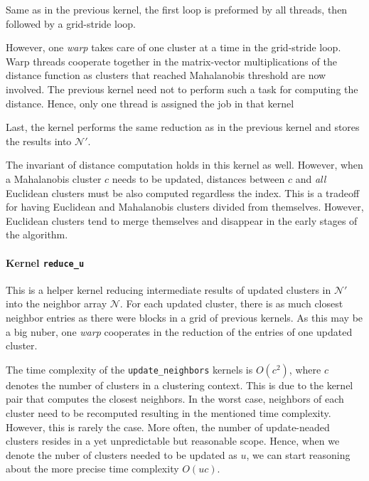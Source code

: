 Same as in the previous kernel, the first loop is preformed by all threads, then followed by a grid-stride loop. 

However, one \emph{warp} takes care of one cluster at a time in the grid-stride loop. Warp threads cooperate together in the matrix-vector multiplications of the distance function as clusters that reached Mahalanobis threshold are now involved. The previous kernel need not to perform such a task for computing the distance. Hence, only one thread is assigned the job in that kernel

Last, the kernel performs the same reduction as in the previous kernel and stores the results into $\mathcal{N}'$.

\begin{rem}
	The invariant of distance computation holds in this kernel as well. However, when a Mahalanobis cluster $c$ needs to be updated, distances between $c$ and \emph{all} Euclidean clusters must be also computed regardless the index. This is a tradeoff for having Euclidean and Mahalanobis clusters divided from themselves. However, Euclidean clusters tend to merge themselves and disappear in the early stages of the algorithm.
\end{rem}

\paragraph{Kernel \texttt{reduce\_u}} This is a helper kernel reducing intermediate results of updated clusters in $\mathcal{N}'$ into the neighbor array $\mathcal{N}$. For each updated cluster, there is as much closest neighbor entries as there were blocks in a grid of previous kernels. As this may be a big nuber, one \emph{warp} cooperates in the reduction of the entries of one updated cluster.

\begin{rem}
	The time complexity of the \texttt{update\_neighbors} kernels is $O(c^2)$, where $c$ denotes the number of clusters in a clustering context. This is due to the kernel pair that computes the closest neighbors. In the worst case, neighbors of each cluster need to be recomputed resulting in the mentioned time complexity. However, this is rarely the case. More often, the number of update-neaded clusters resides in a yet unpredictable but reasonable scope. Hence, when we denote the nuber of clusters needed to be updated as $u$, we can start reasoning about the more precise time complexity $O(uc)$.
\end{rem}
